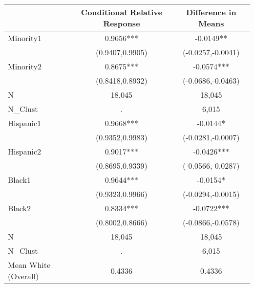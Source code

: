 \begin{tabular}{lcc}
\hline  & Conditional Relative Response & Difference in Means\\
\hline Minority1 & 0.9656*** & -0.0149**\\
 & (0.9407,0.9905) & (-0.0257,-0.0041)\\
Minority2 & 0.8675*** & -0.0574***\\
 & (0.8418,0.8932) & (-0.0686,-0.0463)\\
N & 18,045 & 18,045\\
N\_Clust & . & 6,015\\
Hispanic1 & 0.9668*** & -0.0144*\\
 & (0.9352,0.9983) & (-0.0281,-0.0007)\\
Hispanic2 & 0.9017*** & -0.0426***\\
 & (0.8695,0.9339) & (-0.0566,-0.0287)\\
Black1 & 0.9644*** & -0.0154*\\
 & (0.9323,0.9966) & (-0.0294,-0.0015)\\
Black2 & 0.8334*** & -0.0722***\\
 & (0.8002,0.8666) & (-0.0866,-0.0578)\\
N & 18,045 & 18,045\\
N\_Clust & . & 6,015\\
Mean White (Overall) & 0.4336 & 0.4336\\
\hline\end{tabular}\\
\hfil\\
